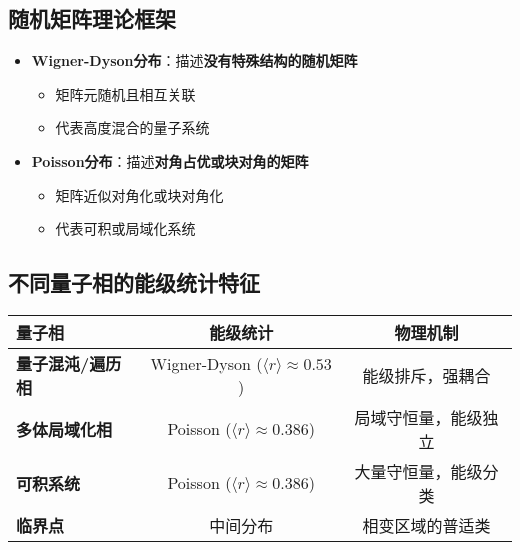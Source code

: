 \documentclass[11pt,a4paper]{article}
\begin{document}
\subsection{随机矩阵理论框架}
\begin{itemize}
    \item \textbf{Wigner-Dyson分布}：描述\textbf{没有特殊结构的随机矩阵}
    \begin{itemize}
        \item 矩阵元随机且相互关联
        \item 代表高度混合的量子系统
    \end{itemize}
    
    \item \textbf{Poisson分布}：描述\textbf{对角占优或块对角的矩阵}
    \begin{itemize}
        \item 矩阵近似对角化或块对角化
        \item 代表可积或局域化系统
    \end{itemize}
\end{itemize}


\subsection{不同量子相的能级统计特征}
\begin{table}[H]
\centering
\begin{tabular}{|l|c|c|}
\hline
\textbf{量子相} & \textbf{能级统计} & \textbf{物理机制} \\
\hline
\textbf{量子混沌/遍历相} & Wigner-Dyson ($\langle r \rangle \approx 0.53$) & 能级排斥，强耦合 \\
\hline
\textbf{多体局域化相} & Poisson ($\langle r \rangle \approx 0.386$) & 局域守恒量，能级独立 \\
\hline
\textbf{可积系统} & Poisson ($\langle r \rangle \approx 0.386$) & 大量守恒量，能级分类 \\
\hline
\textbf{临界点} & 中间分布 & 相变区域的普适类 \\
\hline
\end{tabular}
\end{table}
\end{document}
